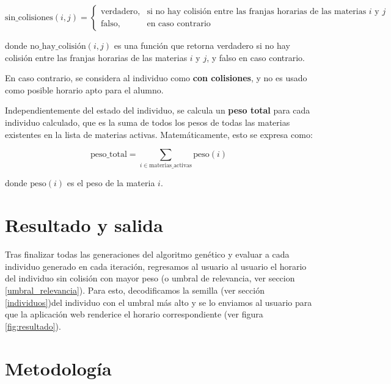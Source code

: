 \begin{equation}
    \text{sin\_colisiones}(i, j) = \begin{cases} 
        \text{verdadero}, & \text{si no hay colisión entre las franjas horarias de las materias } i \text{ y } j \\ 
        \text{falso}, & \text{en caso contrario}
    \end{cases}
    \label{eq:sin_colisiones}
\end{equation}

donde $\text{no\_hay\_colisión}(i, j)$ es una función que retorna verdadero si no hay colisión entre las franjas horarias de las materias $i$ y $j$, y falso en caso contrario.

En caso contrario, se considera al individuo como \textbf{con colisiones}, y no es usado como posible horario apto para el alumno.

Independientemente del estado del individuo, se calcula un \textbf{peso total} para cada individuo calculado, que es la suma de todos los pesos de todas las materias existentes en la lista de materias activas. Matemáticamente, esto se expresa como:

\begin{equation}
    \text{peso\_total} = \sum_{i \in \text{materias\_activas}} \text{peso}(i)
    \label{eq:peso_total}
\end{equation}

donde $\text{peso}(i)$ es el peso de la materia $i$.

\section{Resultado y salida} \label{resultado_salida}

Tras finalizar todas las generaciones del algoritmo genético y evaluar a cada individuo generado en cada iteración, regresamos al usuario al usuario el horario del individuo sin colisión con mayor peso (o umbral de relevancia, ver seccion \ref{umbral_relevancia}). Para esto, decodificamos la semilla (ver sección \ref{individuos})del individuo con el umbral más alto y se lo enviamos al usuario para que la aplicación web renderice el horario correspondiente (ver figura \ref{fig:resultado}).


\section{Metodología} \label{metodologia}

